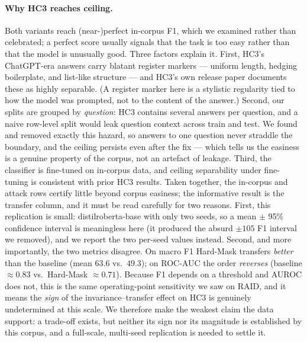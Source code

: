 \documentclass[10pt,twocolumn]{article}
\begin{document}
\paragraph{Why HC3 reaches ceiling.} Both variants reach (near-)perfect in-corpus F1, which we examined rather than celebrated; a perfect score usually signals that the task is too easy rather than that the model is unusually good. Three factors explain it. First, HC3's ChatGPT-era answers carry blatant register markers --- uniform length, hedging boilerplate, and list-like structure --- and HC3's own release paper documents these as highly separable. (A register marker here is a stylistic regularity tied to how the model was prompted, not to the content of the answer.) Second, our splits are grouped by \emph{question}: HC3 contains several answers per question, and a naive row-level split would leak question context across train and test. We found and removed exactly this hazard, so answers to one question never straddle the boundary, and the ceiling persists even after the fix --- which tells us the easiness is a genuine property of the corpus, not an artefact of leakage. Third, the classifier is fine-tuned on in-corpus data, and ceiling separability under fine-tuning is consistent with prior HC3 results. Taken together, the in-corpus and attack rows certify little beyond corpus easiness; the informative result is the transfer column, and it must be read carefully for two reasons. First, this replication is small: distilroberta-base with only two seeds, so a mean $\pm$ 95\% confidence interval is meaningless here (it produced the absurd $\pm105$ F1 interval we removed), and we report the two per-seed values instead. Second, and more importantly, the two metrics disagree. On macro F1 Hard-Mask transfers \emph{better} than the baseline (mean $63.6$ vs.\ $49.3$); on ROC-AUC the order \emph{reverses} (baseline $\approx0.83$ vs.\ Hard-Mask $\approx0.71$). Because F1 depends on a threshold and AUROC does not, this is the same operating-point sensitivity we saw on RAID, and it means the \emph{sign} of the invariance--transfer effect on HC3 is genuinely undetermined at this scale. We therefore make the weakest claim the data support: a trade-off exists, but neither its sign nor its magnitude is established by this corpus, and a full-scale, multi-seed replication is needed to settle it.
\end{document}

